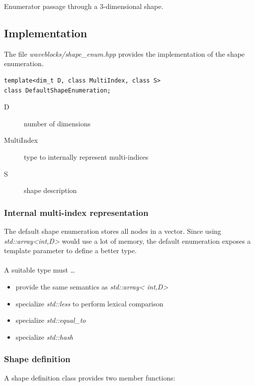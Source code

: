 \documentclass{article}
\begin{document}
\begin{algorithm}[H]
  \caption{Enumerator passage through a 3-dimensional shape.}
\end{algorithm}

\subsection{Implementation}

The file \emph{waveblocks/shape\_enum.hpp} provides the implementation of the shape enumeration.

\begin{verbatim}
template<dim_t D, class MultiIndex, class S>
class DefaultShapeEnumeration;
\end{verbatim}

\begin{description}
\item[D] number of dimensions
\item[MultiIndex] type to internally represent multi-indices
\item[S] shape description
\end{description}

\subsubsection{Internal multi-index representation}
The default shape enumeration stores all nodes in a vector. Since
using \emph{std::array\textless int,D\textgreater} would use a lot of
memory, the default enumeration exposes a template parameter to define
a better type. \\ \\ A suitable type must \dots
\begin{itemize}
\item provide the same semantics as \emph{std::array\textless
    int,D\textgreater}
\item specialize \emph{std::less} to perform lexical comparison
\item specialize \emph{std::equal\_to}
\item specialize \emph{std::hash}
\end{itemize}

\subsubsection{Shape definition}
A shape definition class provides two member functions:
\end{document}
